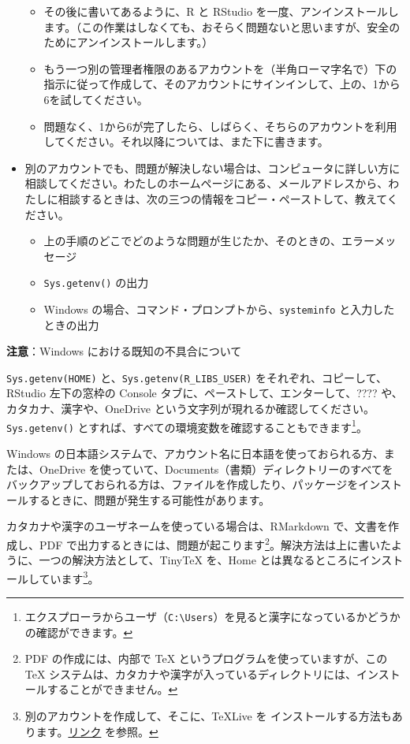 \documentclass[
]{bxjsbook}
\providecommand{\tightlist}{%
  \setlength{\itemsep}{0pt}\setlength{\parskip}{0pt}}
\theoremstyle{definition}
\theoremstyle{definition}
\theoremstyle{definition}
\theoremstyle{definition}
\theoremstyle{remark}
\begin{document}
\begin{itemize}
  \begin{itemize}
  \tightlist
  \item
    その後に書いてあるように、R と RStudio を一度、アンインストールします。（この作業はしなくても、おそらく問題ないと思いますが、安全のためにアンインストールします。）
  \item
    もう一つ別の管理者権限のあるアカウントを（半角ローマ字名で）下の指示に従って作成して、そのアカウントにサインインして、上の、1から6を試してください。
  \item
    問題なく、1から6が完了したら、しばらく、そちらのアカウントを利用してください。それ以降については、また下に書きます。
  \end{itemize}
\item
  別のアカウントでも、問題が解決しない場合は、コンピュータに詳しい方に相談してください。わたしのホームページにある、メールアドレスから、わたしに相談するときは、次の三つの情報をコピー・ペーストして、教えてください。

  \begin{itemize}
  \tightlist
  \item
    上の手順のどこでどのような問題が生じたか、そのときの、エラーメッセージ
  \item
    \texttt{Sys.getenv()} の出力
  \item
    Windows の場合、コマンド・プロンプトから、\texttt{systeminfo} と入力したときの出力
  \end{itemize}
\end{itemize}

\textbf{注意}：Windows における既知の不具合について

\texttt{Sys.getenv(\textquotesingle{}HOME\textquotesingle{})} と、\texttt{Sys.getenv(\textquotesingle{}R\_LIBS\_USER\textquotesingle{})} をそれぞれ、コピーして、RStudio 左下の窓枠の Console タブに、ペーストして、エンターして、???? や、カタカナ、漢字や、OneDrive という文字列が現れるか確認してください。\texttt{Sys.getenv()} とすれば、すべての環境変数を確認することもできます\footnote{エクスプローラからユーザ（\texttt{C:\textbackslash{}Users}）を見ると漢字になっているかどうかの確認ができます。}。

Windows の日本語システムで、アカウント名に日本語を使っておられる方、または、OneDrive を使っていて、Documents（書類）ディレクトリーのすべてをバックアップしておられる方は、ファイルを作成したり、パッケージをインストールするときに、問題が発生する可能性があります。

カタカナや漢字のユーザネームを使っている場合は、RMarkdown で、文書を作成し、PDF で出力するときには、問題が起こります\footnote{PDF の作成には、内部で TeX というプログラムを使っていますが、この TeX システムは、カタカナや漢字が入っているディレクトリには、インストールすることができません。}。解決方法は上に書いたように、一つの解決方法として、TinyTeX を、Home とは異なるところにインストールしています\footnote{別のアカウントを作成して、そこに、TeXLive を インストールする方法もあります。\href{https://icu-hsuzuki.github.io/myds/techmemo.html\#windows-installation-of-r-rstudio-tex}{リンク} を参照。}。
\end{document}
